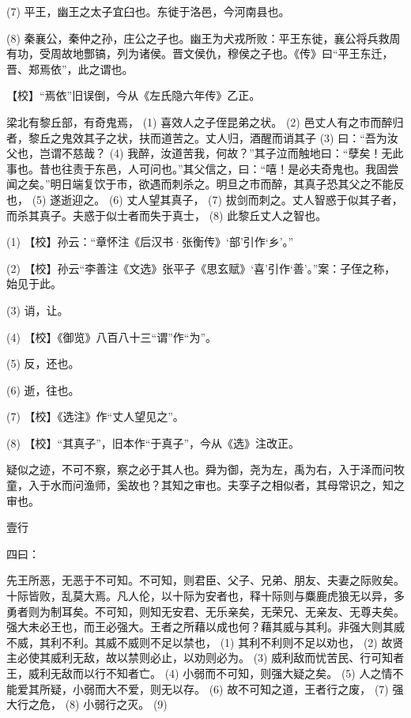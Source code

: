 \documentclass[12pt,UTF8]{ctexbook}
\begin{document}
(7) 平王，幽王之太子宜臼也。东徙于洛邑，今河南县也。

(8) 秦襄公，秦仲之孙，庄公之子也。幽王为犬戎所败：平王东徙，襄公将兵救周有功，受周故地酆镐，列为诸侯。晋文侯仇，穆侯之子也。《传》曰“平王东迁，晋、郑焉依”，此之谓也。

【校】“焉依”旧误倒，今从《左氏隐六年传》乙正。

梁北有黎丘部，有奇鬼焉， (1) 喜效人之子侄昆弟之状。 (2) 邑丈人有之市而醉归者，黎丘之鬼效其子之状，扶而道苦之。丈人归，酒醒而诮其子 (3) 曰：“吾为汝父也，岂谓不慈哉？ (4) 我醉，汝道苦我，何故？”其子泣而触地曰：“孽矣！无此事也。昔也往责于东邑，人可问也。”其父信之，曰：“嘻！是必夫奇鬼也。我固尝闻之矣。”明日端复饮于市，欲遇而刺杀之。明旦之市而醉，其真子恐其父之不能反也， (5) 遂逝迎之。 (6) 丈人望其真子， (7) 拔剑而刺之。丈人智惑于似其子者，而杀其真子。夫惑于似士者而失于真士， (8) 此黎丘丈人之智也。

(1) 【校】孙云：“章怀注《后汉书·张衡传》‘部’引作‘乡’。”

(2) 【校】孙云“李善注《文选》张平子《思玄赋》‘喜’引作‘善’。”案：子侄之称，始见于此。

(3) 诮，让。

(4) 【校】《御览》八百八十三“谓”作“为”。

(5) 反，还也。

(6) 逝，往也。

(7) 【校】《选注》作“丈人望见之”。

(8) 【校】“其真子”，旧本作“于真子”，今从《选》注改正。

疑似之迹，不可不察，察之必于其人也。舜为御，尧为左，禹为右，入于泽而问牧童，入于水而问渔师，奚故也？其知之审也。夫孪子之相似者，其母常识之，知之审也。





壹行


四曰：

先王所恶，无恶于不可知。不可知，则君臣、父子、兄弟、朋友、夫妻之际败矣。十际皆败，乱莫大焉。凡人伦，以十际为安者也，释十际则与麋鹿虎狼无以异，多勇者则为制耳矣。不可知，则知无安君、无乐亲矣，无荣兄、无亲友、无尊夫矣。强大未必王也，而王必强大。王者之所藉以成也何？藉其威与其利。非强大则其威不威，其利不利。其威不威则不足以禁也， (1) 其利不利则不足以劝也， (2) 故贤主必使其威利无敌，故以禁则必止，以劝则必为。 (3) 威利敌而忧苦民、行可知者王，威利无敌而以行不知者亡。 (4) 小弱而不可知，则强大疑之矣。 (5) 人之情不能爱其所疑，小弱而大不爱，则无以存。 (6) 故不可知之道，王者行之废， (7) 强大行之危， (8) 小弱行之灭。 (9)
\end{document}
